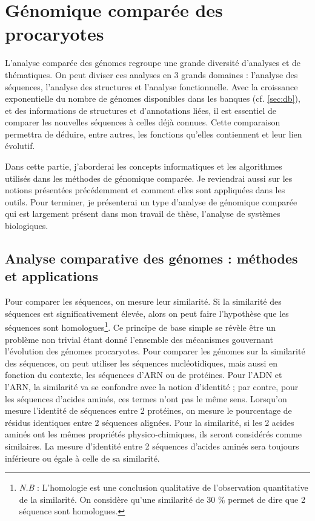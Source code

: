 \chapter{Génomique comparée des procaryotes}
\label{chap:comp}

L'analyse comparée des génomes regroupe une grande diversité d'analyses et de thématiques. On peut diviser ces analyses en 3 grands domaines : l'analyse des séquences, l'analyse des structures et l'analyse fonctionnelle.  Avec la croissance exponentielle du nombre de génomes disponibles dans les banques (cf. \autoref{sec:db}), et des informations de structures et d'annotations liées, il est essentiel de comparer les nouvelles séquences à celles déjà connues. Cette comparaison permettra de déduire, entre autres, les fonctions qu'elles contiennent et leur lien évolutif. 

Dans cette partie, j'aborderai les concepts informatiques et les algorithmes utilisés dans les méthodes de génomique comparée. Je reviendrai aussi sur les notions présentées précédemment et comment elles sont appliquées dans les outils. Pour terminer, je présenterai un type d'analyse de génomique comparée qui est largement présent dans mon travail de thèse, l'analyse de systèmes biologiques.

\section{Analyse comparative des génomes : méthodes et applications}
\label{sec:comp_gen}

Pour comparer les séquences, on mesure leur similarité. Si la similarité des séquences est significativement élevée, alors on peut faire l'hypothèse que les séquences sont homologues\footnote{\textit{N.B} : L'homologie est une conclusion qualitative de l'observation quantitative de la similarité. On considère qu'une similarité de 30 \% permet de dire que 2 séquence sont homologues.}. Ce principe de base simple se révèle être un problème non trivial étant donné l'ensemble des mécanismes gouvernant l'évolution des génomes procaryotes. Pour comparer les génomes sur la similarité des séquences, on peut utiliser les séquences nucléotidiques, mais aussi en fonction du contexte, les séquences d'ARN ou de protéines. Pour l'ADN et l'ARN, la similarité va se confondre avec la notion d’identité ; par contre, pour les séquences d'acides aminés, ces termes n'ont pas le même sens. Lorsqu'on mesure l'identité de séquences entre 2 protéines, on mesure le pourcentage de résidus identiques entre 2 séquences alignées. Pour la similarité, si les 2 acides aminés ont les mêmes propriétés physico-chimiques, ils seront considérés comme similaires. La mesure d'identité entre 2 séquences d'acides aminés sera toujours inférieure ou égale à celle de sa similarité.

